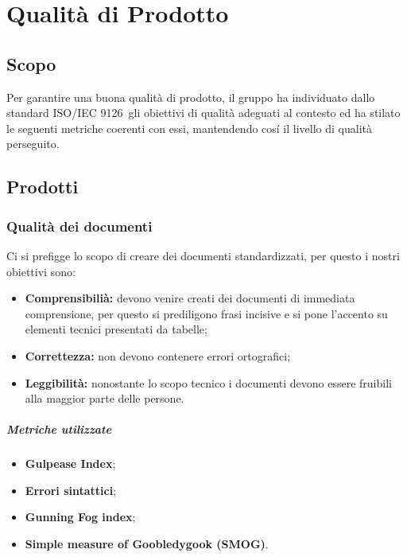 \section{Qualità di Prodotto}
\subsection{Scopo}
Per garantire una buona qualità di prodotto, il gruppo ha individuato dallo standard ISO/IEC 9126\pedice~gli obiettivi di qualità adeguati al contesto ed ha stilato le seguenti metriche coerenti con essi, mantendendo cosí il livello di qualità perseguito.

\subsection{Prodotti}
\subsubsection{Qualità dei documenti}
Ci si prefigge lo scopo di creare dei documenti standardizzati, per questo i nostri obiettivi sono:
\begin{itemize}
	\item{\textbf{Comprensibilià:} devono venire creati dei documenti di immediata comprensione, per questo si prediligono frasi incisive e si pone l'accento su elementi tecnici presentati da tabelle;}
	\item{\textbf{Correttezza:} non devono contenere errori ortografici;}
	\item{\textbf{Leggibilità:} nonostante lo scopo tecnico i documenti devono essere fruibili alla maggior parte delle persone.}
\end{itemize}
\vspace{0.8cm}
\subparagraph{Metriche utilizzate}
\begin{itemize}
	\item{\textbf{Gulpease Index\pedice};}
	\item{\textbf{Errori sintattici};}
	\item{\textbf{Gunning Fog index\pedice};}
	\item{\textbf{Simple measure of Goobledygook (SMOG)\pedice}.}
\end{itemize}
